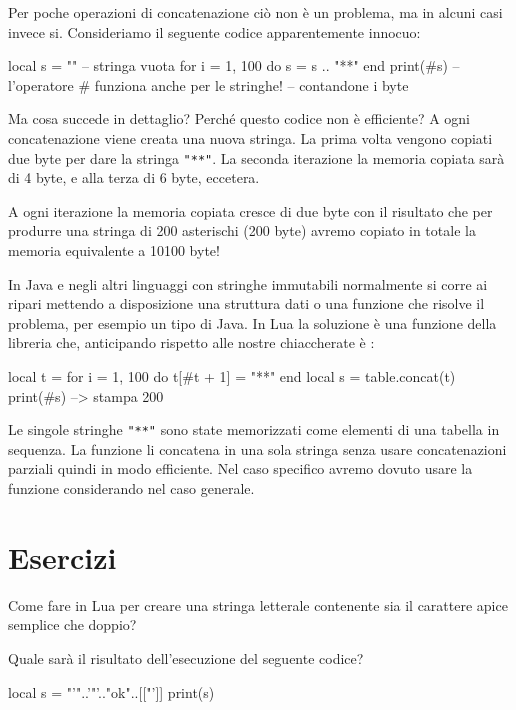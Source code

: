Per poche operazioni di concatenazione ciò non è un problema, ma in alcuni casi
invece si. Consideriamo il seguente codice apparentemente innocuo:
\begin{lines}
local s = ""  -- stringa vuota
for i = 1, 100 do
    s = s .. "**"
end
print(#s) -- l'operatore # funziona anche per le stringhe!
--           contandone i byte
\end{lines}

Ma cosa succede in dettaglio? Perché questo codice non è efficiente? A ogni
concatenazione viene creata una nuova stringa. La prima volta vengono copiati
due byte per dare la stringa \verb|"**"|. La seconda iterazione la memoria
copiata sarà di 4 byte, e alla terza di 6 byte, eccetera.

A ogni iterazione la memoria copiata cresce di due byte con il risultato che per
produrre una stringa di 200 asterischi (200 byte) avremo copiato in totale la
memoria equivalente a 10100 byte!

In Java e negli altri linguaggi con stringhe immutabili normalmente si corre ai
ripari mettendo a disposizione una struttura dati o una funzione che risolve il
problema, per esempio un tipo  di Java. In Lua la soluzione è
una funzione della libreria  che, anticipando rispetto alle nostre
chiaccherate è :
\begin{lines}
local t = {}
for i = 1, 100 do
    t[#t + 1] = "**"
end
local s = table.concat(t)
print(#s) --> stampa 200
\end{lines}

Le singole stringhe \verb|"**"| sono state memorizzati come elementi di una
tabella in sequenza. La funzione  li concatena in una sola
stringa senza usare concatenazioni parziali quindi in modo efficiente. Nel caso
specifico avremo dovuto usare la funzione 
considerando  nel caso generale.


\section{Esercizi}

\begin{Exercise}[label=string-01]
Come fare in Lua per creare una stringa letterale contenente sia il
carattere apice semplice che doppio?
\end{Exercise}

\begin{Exercise}[label=string-02]
Quale sarà il risultato dell'esecuzione del seguente codice?
\begin{lines}
local s = "'"..'"'.."ok"..[["']]
print(s)
\end{lines}
\end{Exercise}

